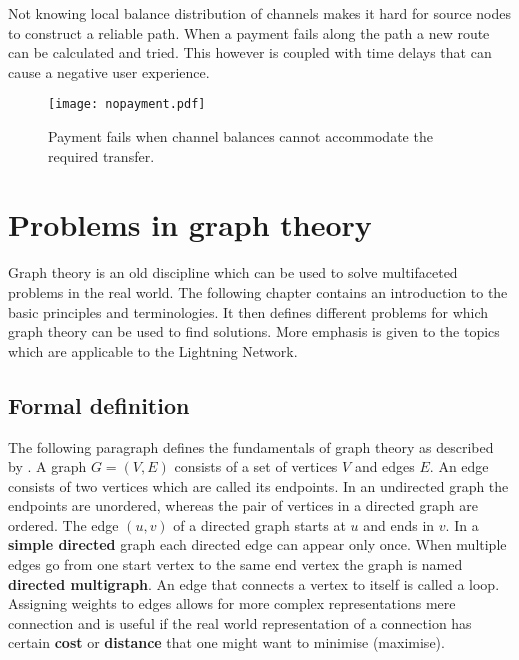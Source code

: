 \documentclass[final]{fhnwreport}       %
\begin{document}
Not knowing local balance distribution of channels makes it hard for source nodes to construct a reliable path. When a payment fails along the path a new route can be calculated and tried. This however is coupled with time delays that can cause a negative user experience.

\begin{figure}[H]
\centering
\texttt{[image: nopayment.pdf]}
\caption{Payment fails when channel balances cannot accommodate the required transfer.}
\label{fig:nopayment}
\end{figure}

\section{Problems in graph theory}
Graph theory is an old discipline which can be used to solve multifaceted problems in the real world. The following chapter contains an introduction to the basic principles and terminologies. It then defines different problems for which graph theory can be used to find solutions. More emphasis is given to the topics which are applicable to the Lightning Network.

\subsection{Formal definition}\label{subsec:formal}
The following paragraph defines the fundamentals of graph theory as described by \citet{rosen_discrete_2012}.
A graph $G=(V,E)$ consists of a set of vertices $V$ and edges $E$. An edge consists of two vertices which are called its endpoints. In an undirected graph the endpoints are unordered, whereas the pair of vertices in a directed graph are ordered. The edge $(u, v)$ of a directed graph starts at $u$ and ends in $v$. In a \textbf{simple directed} graph each directed edge can appear only once. When multiple edges go from one start vertex to the same end vertex the graph is named \textbf{directed multigraph}. An edge that connects a vertex to itself is called a loop. Assigning weights to edges allows for more complex representations mere connection and is useful if the real world representation of a connection has certain \textbf{cost} or \textbf{distance} that one might want to minimise (maximise). 

\end{document}

